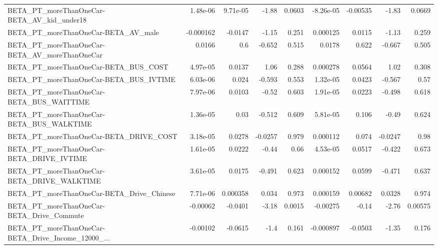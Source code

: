 \begin{tabular}{lrrrrrrrr}
BETA\_PT\_moreThanOneCar-BETA\_AV\_kid\_under18         &    1.48e-06 &     9.71e-05 &    -1.88 &   0.0603 &  -8.26e-05 &    -0.00535 &        -1.83 &        0.0669 \\
BETA\_PT\_moreThanOneCar-BETA\_AV\_male                &   -0.000162 &      -0.0147 &    -1.15 &    0.251 &   0.000125 &      0.0115 &        -1.13 &         0.259 \\
BETA\_PT\_moreThanOneCar-BETA\_AV\_moreThanOneCar      &      0.0166 &          0.6 &   -0.652 &    0.515 &     0.0178 &       0.622 &       -0.667 &         0.505 \\
BETA\_PT\_moreThanOneCar-BETA\_BUS\_COST               &    4.97e-05 &       0.0137 &     1.06 &    0.288 &   0.000278 &      0.0564 &         1.02 &         0.308 \\
BETA\_PT\_moreThanOneCar-BETA\_BUS\_IVTIME             &    6.03e-06 &        0.024 &   -0.593 &    0.553 &   1.32e-05 &      0.0423 &       -0.567 &          0.57 \\
BETA\_PT\_moreThanOneCar-BETA\_BUS\_WAITTIME           &    7.97e-06 &       0.0103 &    -0.52 &    0.603 &   1.91e-05 &      0.0223 &       -0.498 &         0.618 \\
BETA\_PT\_moreThanOneCar-BETA\_BUS\_WALKTIME           &    1.36e-05 &         0.03 &   -0.512 &    0.609 &   5.81e-05 &       0.106 &        -0.49 &         0.624 \\
BETA\_PT\_moreThanOneCar-BETA\_DRIVE\_COST             &    3.18e-05 &       0.0278 &  -0.0257 &    0.979 &   0.000112 &       0.074 &      -0.0247 &          0.98 \\
BETA\_PT\_moreThanOneCar-BETA\_DRIVE\_IVTIME           &    1.61e-05 &       0.0222 &    -0.44 &     0.66 &   4.53e-05 &      0.0517 &       -0.422 &         0.673 \\
BETA\_PT\_moreThanOneCar-BETA\_DRIVE\_WALKTIME         &    3.61e-05 &       0.0175 &   -0.491 &    0.623 &   0.000152 &      0.0599 &       -0.471 &         0.637 \\
BETA\_PT\_moreThanOneCar-BETA\_Drive\_Chinese          &    7.71e-06 &     0.000358 &    0.034 &    0.973 &   0.000159 &     0.00682 &       0.0328 &         0.974 \\
BETA\_PT\_moreThanOneCar-BETA\_Drive\_Commute          &    -0.00062 &      -0.0401 &    -3.18 &   0.0015 &   -0.00275 &       -0.14 &        -2.76 &       0.00575 \\
BETA\_PT\_moreThanOneCar-BETA\_Drive\_Income\_12000\_... &    -0.00102 &      -0.0615 &     -1.4 &    0.161 &  -0.000897 &     -0.0503 &        -1.35 &         0.176 \\

\end{tabular}
